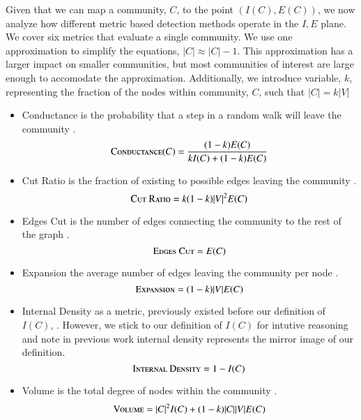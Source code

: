 \documentclass[phd,tocprelim]{cornell}
\begin{document}
Given that we can map a community, $C$, to the point $(I(C), E(C))$, we now analyze how different metric based detection methods operate in the $I,E$ plane.  We cover six metrics that evaluate a single community.  We use one approximation to simplify the equations, $|C| \approx |C| - 1$.  This approximation has a larger impact on smaller communities, but most communities of interest are large enough to accomodate the approximation.  Additionally, we introduce variable, $k$, representing the fraction of the nodes within community, $C$, such that $|C| = k |V|$
\begin{itemize}
\item {\sc Conductance} is the probability that a step in a random walk will leave the community \cite{}.
\begin{equation}
\mbox{\sc Conductance}(C) = \frac{(1 - k)E(C)}{kI(C) + (1 - k)E(C)}
\end{equation}
\item {\sc Cut Ratio} is the fraction of existing to possible edges leaving the community \cite{}.
\begin{equation}
\mbox{\sc Cut Ratio} = k(1 - k)|V |^2E(C)
\end{equation}
\item {\sc Edges Cut} is the number of edges connecting the community to the rest of the graph \cite{}.\begin{equation}
\mbox{\sc Edges Cut} = E(C)
\end{equation}
\item {\sc Expansion} the average number of edges leaving the community per node \cite{}.
\begin{equation}
\mbox{\sc Expansion} = (1 - k)|V |E(C)
\end{equation}
\item {\sc Internal Density} as a metric, previously existed before our definition of $I(C)$, \cite{}.  However, we stick to our definition of $I(C)$ for intutive reasoning and note in previous work internal density represents the mirror image of our definition.
\begin{equation}
\mbox{\sc Internal Density} = 1 - I(C)
\end{equation}
\item {\sc Volume} is the total degree of nodes within the community \cite{}.
\begin{equation}
\mbox{\sc Volume} = |C|^2 I(C) + (1 - k)|C||V |E(C)
\end{equation}
\end{itemize}
\end{document}

